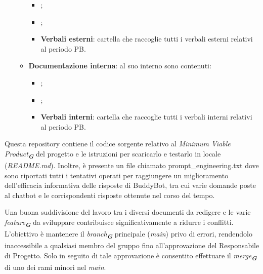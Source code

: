 \begin{itemize}
\begin{itemize}
\begin{itemize}
            \item {};
            \item {};
            \item \textbf{Verbali esterni}: cartella che raccoglie tutti i verbali esterni relativi al periodo PB.
        \end{itemize}
        \item \textbf{Documentazione interna}: al suo interno sono contenuti:
        \begin{itemize}
            \item {};
            \item {};
            \item \textbf{Verbali interni}: cartella che raccoglie tutti i verbali interni relativi al periodo PB.
        \end{itemize}
    \end{itemize}
\end{itemize}

\label{sec:repo_buddybot}
Questa repository contiene il codice sorgente relativo al \emph{Minimum Viable Product}\textsubscript{\textit{\textbf{G}}} del progetto e le
istruzioni per scaricarlo e testarlo in locale (\emph{README.md}).
Inoltre, è presente un file chiamato prompt\_engineering.txt dove sono riportati tutti i tentativi operati 
per raggiungere un miglioramento dell'efficacia informativa delle risposte di BuddyBot, 
tra cui varie domande poste al chatbot e le corrispondenti risposte ottenute nel corso del tempo.

Una buona suddivisione del lavoro tra i diversi documenti da redigere e le varie \emph{feature}\textsubscript{\textit{\textbf{G}}}
da sviluppare contribuisce significativamente a ridurre i conflitti. L’obiettivo è mantenere 
il \emph{branch}\textsubscript{\textit{\textbf{G}}} principale (\emph{main}) privo di errori, rendendolo inaccessibile a qualsiasi membro 
del gruppo fino all’approvazione del Responsabile di Progetto. Solo in seguito di tale
approvazione è consentito effettuare il \emph{merge}\textsubscript{\textit{\textbf{G}}} di uno dei rami minori nel \emph{main}.


